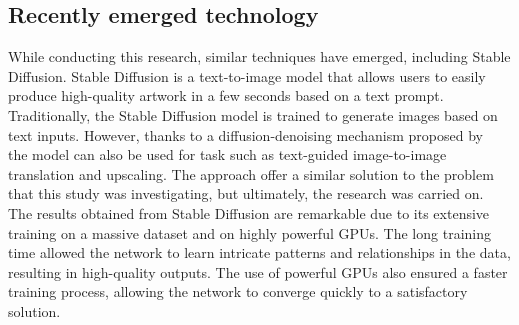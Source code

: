 \subsection{Recently emerged technology}
While conducting this research, similar techniques have emerged, including Stable Diffusion. Stable Diffusion is a text-to-image model that allows users to easily produce high-quality artwork in a few seconds based on a text prompt. Traditionally, the Stable Diffusion model is trained to generate images based on text inputs. However, thanks to a diffusion-denoising mechanism proposed by~\cite{SDEedit} the model can also be used for task such as text-guided image-to-image translation and upscaling.
The approach offer a similar solution to the problem that this study was investigating, but ultimately, the research was carried on. \\
The results obtained from Stable Diffusion are remarkable due to its extensive training on a massive dataset and on highly powerful GPUs. The long training time allowed the network to learn intricate patterns and relationships in the data, resulting in high-quality outputs. The use of powerful GPUs also ensured a faster training process, allowing the network to converge quickly to a satisfactory solution.

